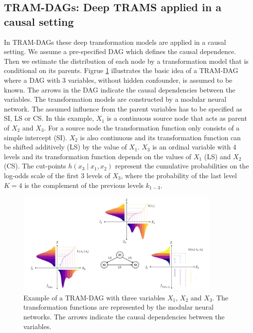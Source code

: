 \subsection{TRAM-DAGs: Deep TRAMS applied in a causal setting} \label{sec:tram_dags}



In TRAM-DAGs these deep transformation models are applied in a causal setting. We assume a pre-specified DAG which defines the causal dependence. Then we estimate the distribution of each node by a transformation model that is conditional on its parents. Figrue \ref{fig:tram_dag} illustrates the basic idea of a TRAM-DAG where a DAG with 3 variables, without hidden confounder, is assumed to be known. The arrows in the DAG indicate the causal dependencies between the variables. The transformation models are constructed by a modular neural network. The assumed influence from the parent variables has to be specified as SI, LS or CS. In this example, $X_1$ is a continuous source node that acts as parent of $X_2$ and $X_3$. For a source node the transformation function only consists of a simple intercept (SI). $X_2$ is also continuous and its transformation function can be shifted additively (LS) by the value of $X_1$. $X_3$ is an ordinal variable with 4 levels and its transformation function depends on the values of $X_1$ (LS) and $X_2$ (CS). The cut-points $h(x_3 \mid x_1, x_2)$ represent the cumulative probabilities on the log-odds scale of the first 3 levels of $X_3$, where the probability of the last level $K=4$ is the complement of the previous levels $k_{1-3}$.

\begin{figure}[H]
\centering
\includegraphics[width=0.9\textwidth]{img/tram_dag.png}
\caption{Example of a TRAM-DAG with three variables $X_1$, $X_2$ and $X_3$. The transformation functions are represented by the modular neural networks. The arrows indicate the causal dependencies between the variables.}
\label{fig:tram_dag}
\end{figure}

